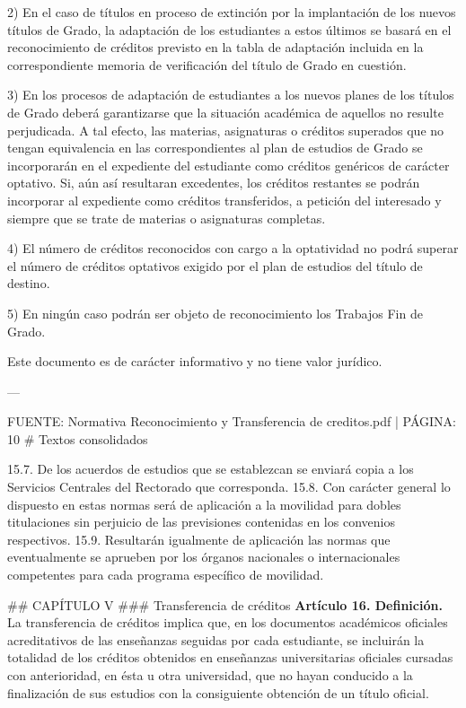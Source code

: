 \documentclass{article}
\begin{document}
\begin{itemize}
\begin{itemize}
\begin{scriptsize}
                  2) En el caso de títulos en proceso de extinción por la implantación de los nuevos títulos de Grado, la adaptación de los estudiantes a estos últimos se basará en el reconocimiento de créditos previsto en la tabla de adaptación incluida en la correspondiente memoria de verificación del título de Grado en cuestión.

                  3) En los procesos de adaptación de estudiantes a los nuevos planes de los títulos de Grado deberá garantizarse que la situación académica de aquellos no resulte perjudicada. A tal efecto, las materias, asignaturas o créditos superados que no tengan equivalencia en las correspondientes al plan de estudios de Grado se incorporarán en el expediente del estudiante como créditos genéricos de carácter optativo. Si, aún así resultaran excedentes, los créditos restantes se podrán incorporar al expediente como créditos transferidos, a petición del interesado y siempre que se trate de materias o asignaturas completas.

                  4) El número de créditos reconocidos con cargo a la optatividad no podrá superar el número de créditos optativos exigido por el plan de estudios del título de destino.

                  5) En ningún caso podrán ser objeto de reconocimiento los Trabajos Fin de Grado.

                  Este documento es de carácter informativo y no tiene valor jurídico.

                  ---

                  FUENTE: Normativa Reconocimiento y Transferencia de creditos.pdf | PÁGINA: 10
                  \# Textos consolidados

                  15.7. De los acuerdos de estudios que se establezcan se enviará copia a los Servicios Centrales del Rectorado que corresponda.
                  15.8. Con carácter general lo dispuesto en estas normas será de aplicación a la movilidad para dobles titulaciones sin perjuicio de las previsiones contenidas en los convenios respectivos.
                  15.9. Resultarán igualmente de aplicación las normas que eventualmente se aprueben por los órganos nacionales o internacionales competentes para cada programa específico de movilidad.

                  \#\# CAPÍTULO V
                  \#\#\# Transferencia de créditos
                  \textbf{Artículo 16. Definición.}
                  La transferencia de créditos implica que, en los documentos académicos oficiales acreditativos de las enseñanzas seguidas por cada estudiante, se incluirán la totalidad de los créditos obtenidos en enseñanzas universitarias oficiales cursadas con anterioridad, en ésta u otra universidad, que no hayan conducido a la finalización de sus estudios con la consiguiente obtención de un título oficial.


\end{scriptsize}
\end{itemize}
\end{itemize}
\end{document}
